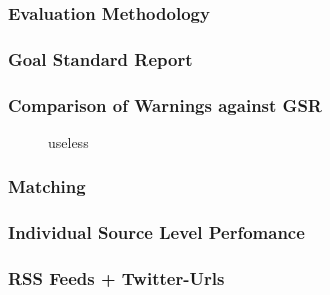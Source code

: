 \documentclass{beamer}
\begin{document}
\begin{frame}
    \frametitle{Evaluation Methodology}
\end{frame}


\begin{frame}
    \frametitle{Goal Standard Report}
\end{frame}


\begin{frame}
    \frametitle{Comparison of Warnings against GSR}
\begin{figure}
\centering
\hfill
{}
\hfill
{}
\hfill
\caption{useless}
\end{figure}

\end{frame}


\begin{frame}
    \frametitle{Matching}
\end{frame}


\begin{frame}
    \frametitle{Individual Source Level Perfomance}
\end{frame}

\begin{frame}
    \frametitle{RSS Feeds + Twitter-Urls}
\end{frame}
\end{document}
